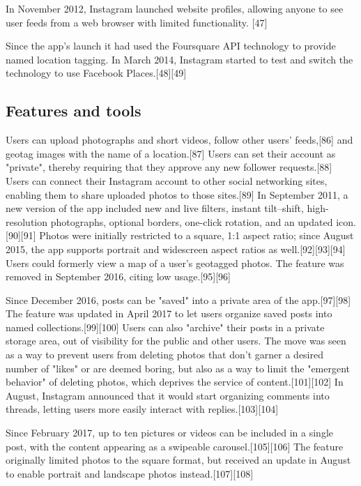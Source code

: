 \documentclass[12pt]{article}
\begin{document}
In November 2012, Instagram launched website profiles, allowing anyone to see user feeds from a web browser with limited functionality. [47]

Since the app's launch it had used the Foursquare API technology to provide named location tagging. In March 2014, Instagram started to test and switch the technology to use Facebook Places.[48][49] 






\subsection{Features and tools}


Users can upload photographs and short videos, follow other users' feeds,[86] and geotag images with the name of a location.[87] Users can set their account as "private", thereby requiring that they approve any new follower requests.[88] Users can connect their Instagram account to other social networking sites, enabling them to share uploaded photos to those sites.[89] In September 2011, a new version of the app included new and live filters, instant tilt–shift, high-resolution photographs, optional borders, one-click rotation, and an updated icon.[90][91] Photos were initially restricted to a square, 1:1 aspect ratio; since August 2015, the app supports portrait and widescreen aspect ratios as well.[92][93][94] Users could formerly view a map of a user's geotagged photos. The feature was removed in September 2016, citing low usage.[95][96]

Since December 2016, posts can be "saved" into a private area of the app.[97][98] The feature was updated in April 2017 to let users organize saved posts into named collections.[99][100] Users can also "archive" their posts in a private storage area, out of visibility for the public and other users. The move was seen as a way to prevent users from deleting photos that don't garner a desired number of "likes" or are deemed boring, but also as a way to limit the "emergent behavior" of deleting photos, which deprives the service of content.[101][102] In August, Instagram announced that it would start organizing comments into threads, letting users more easily interact with replies.[103][104]

Since February 2017, up to ten pictures or videos can be included in a single post, with the content appearing as a swipeable carousel.[105][106] The feature originally limited photos to the square format, but received an update in August to enable portrait and landscape photos instead.[107][108]
\end{document}
